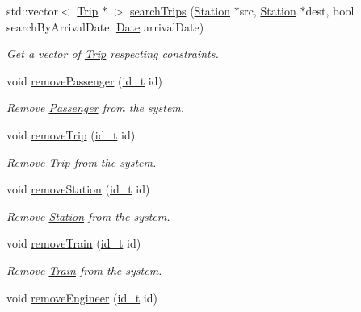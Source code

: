 \begin{DoxyCompactItemize}
std\+::vector$<$ \mbox{\hyperlink{classTrip}{Trip}} $\ast$ $>$ \mbox{\hyperlink{classSystem_a293b247432ab577c9bf0ba7285a6eeda}{search\+Trips}} (\mbox{\hyperlink{classStation}{Station}} $\ast$src, \mbox{\hyperlink{classStation}{Station}} $\ast$dest, bool search\+By\+Arrival\+Date, \mbox{\hyperlink{classDate}{Date}} arrival\+Date)
\begin{DoxyCompactList}\small\item\em Get a vector of \mbox{\hyperlink{classTrip}{Trip}} respecting constraints. \end{DoxyCompactList}\item 
void \mbox{\hyperlink{classSystem_a95041a0cbce21f64feb99d437a7b340d}{remove\+Passenger}} (\mbox{\hyperlink{project__utils_8h_a8f3a969054ad2200720b96e7e23dd4e1}{id\+\_\+t}} id)
\begin{DoxyCompactList}\small\item\em Remove \mbox{\hyperlink{classPassenger}{Passenger}} from the system. \end{DoxyCompactList}\item 
void \mbox{\hyperlink{classSystem_a38046fbc01e62b7ff06799c2f8bc8ef6}{remove\+Trip}} (\mbox{\hyperlink{project__utils_8h_a8f3a969054ad2200720b96e7e23dd4e1}{id\+\_\+t}} id)
\begin{DoxyCompactList}\small\item\em Remove \mbox{\hyperlink{classTrip}{Trip}} from the system. \end{DoxyCompactList}\item 
void \mbox{\hyperlink{classSystem_afb7a703741077530b0dd299872f7892f}{remove\+Station}} (\mbox{\hyperlink{project__utils_8h_a8f3a969054ad2200720b96e7e23dd4e1}{id\+\_\+t}} id)
\begin{DoxyCompactList}\small\item\em Remove \mbox{\hyperlink{classStation}{Station}} from the system. \end{DoxyCompactList}\item 
void \mbox{\hyperlink{classSystem_ab36039b5b1cffc88356398bac8b4f79b}{remove\+Train}} (\mbox{\hyperlink{project__utils_8h_a8f3a969054ad2200720b96e7e23dd4e1}{id\+\_\+t}} id)
\begin{DoxyCompactList}\small\item\em Remove \mbox{\hyperlink{classTrain}{Train}} from the system. \end{DoxyCompactList}\item 
void \mbox{\hyperlink{classSystem_a73bc771e0038b7b7b08a185edc2354f4}{remove\+Engineer}} (\mbox{\hyperlink{project__utils_8h_a8f3a969054ad2200720b96e7e23dd4e1}{id\+\_\+t}} id)

\end{DoxyCompactItemize}
